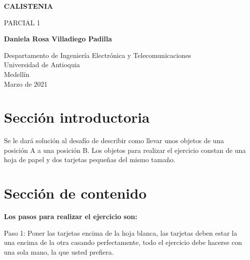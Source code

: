 \documentclass{article}
\begin{document}
\begin{titlepage}
    \begin{center}
        \vspace*{1cm}
            
        \Huge
        \textbf{CALISTENIA}
            
        \vspace{0.5cm}
        \LARGE
        PARCIAL 1
            
        \vspace{1.5cm}
            
        \textbf{Daniela Rosa Villadiego Padilla}
            
        \vfill
            
        \vspace{0.8cm}
            
        \Large
        Despartamento de Ingeniería Electrónica y Telecomunicaciones\\
        Universidad de Antioquia\\
        Medellín\\
        Marzo de 2021
            
    \end{center}
\end{titlepage}

\tableofcontents

\section{Sección introductoria}
 Se le dará solución al desafío de describir como llevar unos objetos de una posición A a una posición B. Los objetos para realizar el ejercicio constan de una hoja de papel y dos tarjetas pequeñas del mismo tamaño.

\section{Sección de contenido} \label{contenido}

    \textbf{Los pasos para realizar el ejercicio son:}
    
     \vspace{0.3cm}
     
     Paso 1: Poner las tarjetas encima de la hoja blanca, las tarjetas deben estar la una encima de la otra casando perfectamente, todo el ejercicio debe hacerse con una sola mano, la que usted prefiera.
    
     \vspace{0.3cm}
     
\end{document}
